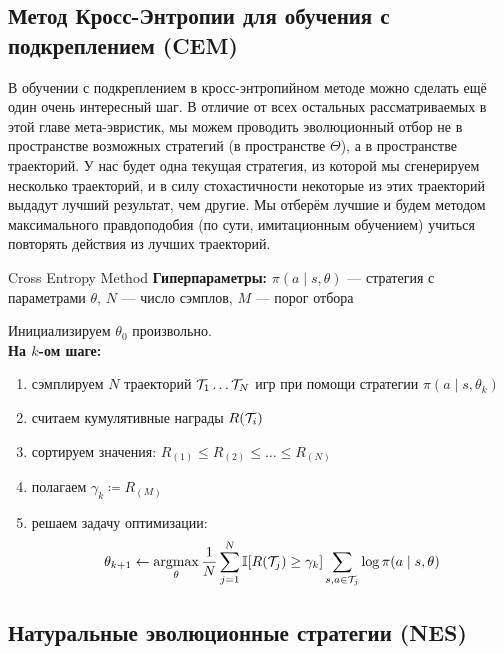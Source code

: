 \subsection{Метод Кросс-Энтропии для обучения с подкреплением (CEM)}

В обучении с подкреплением в кросс-энтропийном методе можно сделать ещё один очень интересный шаг. В отличие от всех остальных рассматриваемых в этой главе мета-эвристик, мы можем проводить эволюционный отбор не в пространстве возможных стратегий (в пространстве $\Theta$), а в пространстве траекторий. У нас будет одна текущая стратегия, из которой мы сгенерируем несколько траекторий, и в силу стохастичности некоторые из этих траекторий выдадут лучший результат, чем другие. Мы отберём лучшие и будем методом максимального правдоподобия (по сути, имитационным обучением) учиться повторять действия из лучших траекторий.  

\begin{algorithm}[label=alg:cem]{Cross Entropy Method}
\textbf{Гиперпараметры:} $\pi(a \mid s, \theta)$ --- стратегия с параметрами $\theta$, $N$ --- число сэмплов, $M$ --- порог отбора

\vspace{0.3cm}
Инициализируем $\theta_0$ произвольно. \\
\textbf{На $k$-ом шаге:}
\begin{enumerate}
    \item сэмплируем $N$ траекторий $\mathcal{T}_1 \dots \mathcal{T}_N$ игр при помощи стратегии $\pi(a \mid s, \theta_k)$
    \item считаем кумулятивные награды $R(\mathcal{T}_i)$
    \item сортируем значения: $R_{(1)} \le R_{(2)} \le \dots \le R_{(N)}$
    \item полагаем $\gamma_k \coloneqq R_{(M)}$
    \item решаем задачу оптимизации:
    $$\theta_{k+1} \leftarrow \mathop{\mathrm{argmax}}_{\theta} \frac{1}{N} \sum_{j=1}^N \mathbb{I}[R(\mathcal{T}_j) \ge \gamma_k] \sum_{s, a \in \mathcal{T}_j} \log \pi(a \mid s, \theta)$$
\end{enumerate}
\end{algorithm}


\subsection{Натуральные эволюционные стратегии (NES)}\label{subsec:nes}

